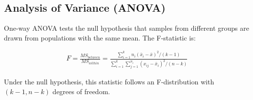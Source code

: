 \documentclass[12pt]{article}
\begin{document}
\subsection{Analysis of Variance (ANOVA)}

One-way ANOVA tests the null hypothesis that samples from different groups are drawn from populations with the same mean. The F-statistic is:

\begin{align}
F = \frac{MS_{between}}{MS_{within}} = \frac{\sum_{i=1}^{k} n_i(\bar{x}_i - \bar{x})^2 / (k-1)}{\sum_{i=1}^{k}\sum_{j=1}^{n_i} (x_{ij} - \bar{x}_i)^2 / (n-k)}
\end{align}

Under the null hypothesis, this statistic follows an F-distribution with $(k-1, n-k)$ degrees of freedom.
\end{document}

